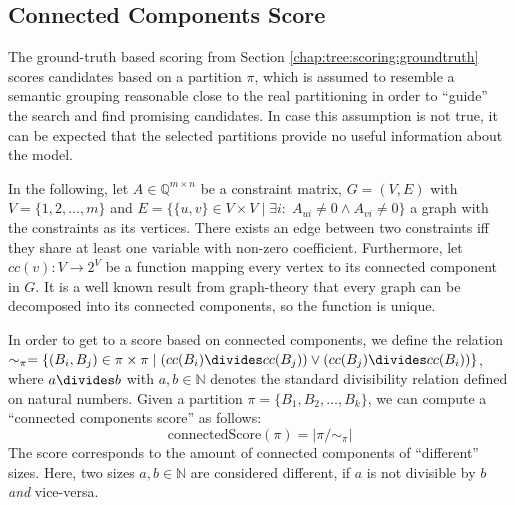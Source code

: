 			\clearpage

		\subsection{Connected Components Score}

			The ground-truth based scoring from Section \ref{chap:tree:scoring:groundtruth} scores candidates based on a partition $\pi$, which is assumed to resemble a semantic grouping reasonable close to the real partitioning in order to \enquote{guide} the search and find promising candidates.
			In case this assumption is not true, it can be expected that the selected partitions provide no useful information about the model.

			In the following, let $A \in \mathbb{Q}^{m \times n}$ be a constraint matrix, $G = (V, E)$ with $V = \{ 1, 2, \ldots, m \}$ and $E = \{ \{ u, v \} \in V \times V \mid \exists i: \; A_{ui} \neq 0 \land A_{vi} \neq 0 \}$ a graph with the constraints as its vertices.
			There exists an edge between two constraints iff they share at least one variable with non-zero coefficient.
			Furthermore, let $cc(v): V \xrightarrow{} 2^V$ be a function mapping every vertex to its connected component in $G$.
			It is a well known result from graph-theory that every graph can be decomposed into its connected components, so the function is unique. 

			In order to get to a score based on connected components, we define the relation $\sim_\pi = \{ (B_i, B_j) \in \pi \times \pi \mid (cc(B_i) \divides cc(B_j)) \lor (cc(B_j) \divides cc(B_i)) \}$, where $a \divides b$ with $a, b \in \mathbb{N}$ denotes the standard divisibility relation defined on natural numbers.
			Given a partition $\pi = \{ B_1, B_2, \ldots, B_k \}$, we can compute a \enquote{connected components score} as follows:
			\begin{equation*}
				\mathrm{connectedScore}(\pi) = |\pi/\sim_\pi|
			\end{equation*}
			The score corresponds to the amount of connected components of \enquote{different} sizes.
			Here, two sizes $a, b \in \mathbb{N}$ are considered different, if $a$ is not divisible by $b$ \textit{and} vice-versa.

			\clearpage
